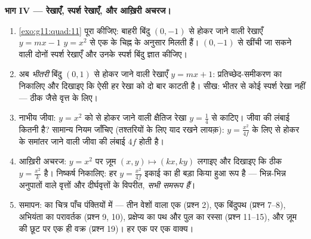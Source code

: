 \begin{problem}
\medskip
\noindent\textbf{भाग IV --- रेखाएँ, स्पर्श रेखाएँ, और आख़िरी अचरज।}
\begin{enumerate}[resume]
  \item \cref{exo:g11:quad:11} पूरा कीजिए: बाहरी बिंदु $(0, -1)$ से होकर जाने वाली रेखाएँ $y = mx - 1$
        $y = x^2$ से एक  के चिह्न के अनुसार मिलती हैं। $(0, -1)$ से खींची
        जा सकने वाली दोनों स्पर्श रेखाएँ और उनके स्पर्श बिंदु ज्ञात कीजिए।
  \item अब \emph{भीतरी} बिंदु $(0, 1)$ से होकर जाने वाली रेखाएँ $y = mx + 1$:
        प्रतिच्छेद-समीकरण का  निकालिए और दिखाइए कि ऐसी हर रेखा
         को दो बार काटती है। सीख: भीतर से कोई स्पर्श रेखा नहीं ---
        ठीक जैसे वृत्त के लिए।
  \item नाभीय जीवा: $y = x^2$ को  से होकर जाने वाली क्षैतिज रेखा $y = \frac14$ से
        काटिए। जीवा की लंबाई कितनी है? सामान्य नियम जाँचिए (तश्तरियों के
        लिए याद रखने लायक़): $y = \frac{x^2}{4f}$ के लिए  से होकर  के समांतर जाने
        वाली जीवा की लंबाई $4f$ होती है।
  \item आख़िरी अचरज:  $y = x^2$ पर ज़ूम $(x, y) \mapsto (kx, ky)$ लगाइए और दिखाइए कि 
        ठीक $y = \frac{x^2}{k}$ है। निष्कर्ष निकालिए: हर  $y = \frac{x^2}{4f}$ इकाई  का ही
        बड़ा किया हुआ रूप है --- भिन्न-भिन्न अनुपातों वाले वृत्तों और
        दीर्घवृत्तों के विपरीत, \emph{सभी  समरूप हैं}।
  \item समापन:  का चित्र पाँच पंक्तियों में --- तीन वेशों वाला एक
         (प्रश्न 2), एक बिंदुपथ (प्रश्न 7--8), अभियंता का परावर्तक
        (प्रश्न 9, 10), प्रक्षेप्य का पथ और पुल का रस्सा (प्रश्न 11--15),
        और ज़ूम की छूट पर एक ही वक्र (प्रश्न 19)। हर एक पर एक वाक्य।
\end{enumerate}
\end{problem}
